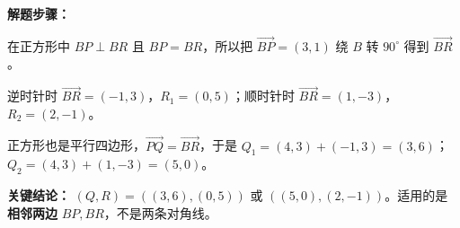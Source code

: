\begin{examplebox}
    \textbf{\textcolor{CExample}{解题步骤：}}

    \begin{description}[style=nextline,leftmargin=2.8em,labelsep=0.5em,itemsep=0.4em]
        \item[\textbf{第一步（识别相邻边）}]
          在正方形中 $BP\perp BR$ 且 $BP=BR$，所以把 $\overrightarrow{BP}=(3,1)$ 绕 $B$ 转 $90^\circ$ 得到 $\overrightarrow{BR}$。
        \item[\textbf{第二步（求 $R$ 的两个位置）}]
          逆时针时 $\overrightarrow{BR}=(-1,3)$，$R_1=(0,5)$；顺时针时 $\overrightarrow{BR}=(1,-3)$，$R_2=(2,-1)$。
        \item[\textbf{第三步（利用平行四边形求 $Q$）}]
          正方形也是平行四边形，$\overrightarrow{PQ}=\overrightarrow{BR}$，于是 $Q_1=(4,3)+(-1,3)=(3,6)$；$Q_2=(4,3)+(1,-3)=(5,0)$。
    \end{description}
    \textbf{\textcolor{CExample}{关键结论：}} $\boxed{(Q,R)=((3,6),(0,5))\text{ 或 }((5,0),(2,-1))}$。适用的是\textbf{相邻两边} $BP,BR$，不是两条对角线。
\end{examplebox}
